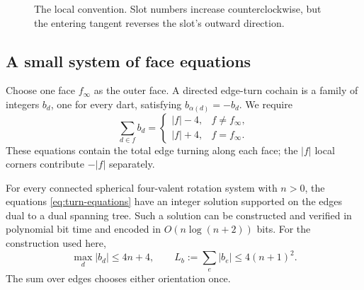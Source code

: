 \begin{figure}[ht]
\centering
{}
\caption{The local convention. Slot numbers increase counterclockwise,
but the entering tangent reverses the slot's outward direction.}
\label{fig:turn-convention}
\end{figure}

\subsection{A small system of face equations}

Choose one face $f_\infty$ as the outer face. A directed edge-turn cochain
is a family of integers $b_d$, one for every dart, satisfying
$b_{\alpha(d)}=-b_d$. We require
\begin{equation}\label{eq:turn-equations}
 \sum_{d\in f} b_d=
 \begin{cases}
 |f|-4,&f\ne f_\infty,\\
 |f|+4,&f=f_\infty.
 \end{cases}
\end{equation}
These equations contain the total edge turning along each face; the
$|f|$ local corners contribute $-|f|$ separately.

\begin{theorem}
\label{thm:turn-construction}
For every connected spherical four-valent rotation system with $n>0$, the
equations \eqref{eq:turn-equations} have an integer solution supported on
the edges dual to a dual spanning tree. Such a solution can be constructed
and verified in polynomial bit time and encoded in $O(n\log(n+2))$ bits.
For the construction used here,
\begin{equation}\label{eq:cochain-bounds}
 \max_d |b_d|\le4n+4,
 \qquad
 L_b:=\sum_{e}|b_e|\le4(n+1)^2.
\end{equation}
The sum over edges chooses either orientation once.
\end{theorem}

